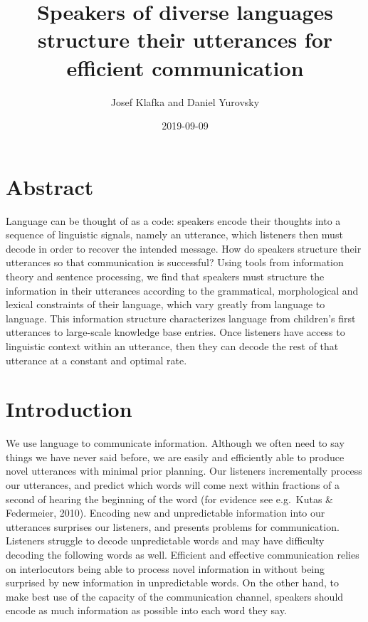 \documentclass[11pt,]{article}
\title{Speakers of diverse languages structure their utterances for efficient communication}
\author{Josef Klafka and Daniel Yurovsky}
\date{2019-09-09}
\begin{document}
\maketitle

\hypertarget{abstract}{%
\section{Abstract}\label{abstract}}

Language can be thought of as a code: speakers encode their thoughts into a sequence of linguistic signals, namely an utterance, which listeners then must decode in order to recover the intended message. How do speakers structure their utterances so that communication is successful? Using tools from information theory and sentence processing, we find that speakers must structure the information in their utterances according to the grammatical, morphological and lexical constraints of their language, which vary greatly from language to language. This information structure characterizes language from children's first utterances to large-scale knowledge base entries. Once listeners have access to linguistic context within an utterance, then they can decode the rest of that utterance at a constant and optimal rate.

\hypertarget{introduction}{%
\section{Introduction}\label{introduction}}

We use language to communicate information. Although we often need to say things we have never said before, we are easily and efficiently able to produce novel utterances with minimal prior planning. Our listeners incrementally process our utterances, and predict which words will come next within fractions of a second of hearing the beginning of the word (for evidence see e.g.~Kutas \& Federmeier, 2010). Encoding new and unpredictable information into our utterances surprises our listeners, and presents problems for communication. Listeners struggle to decode unpredictable words and may have difficulty decoding the following words as well. Efficient and effective communication relies on interlocutors being able to process novel information in without being surprised by new information in unpredictable words. On the other hand, to make best use of the capacity of the communication channel, speakers should encode as much information as possible into each word they say.
\end{document}
